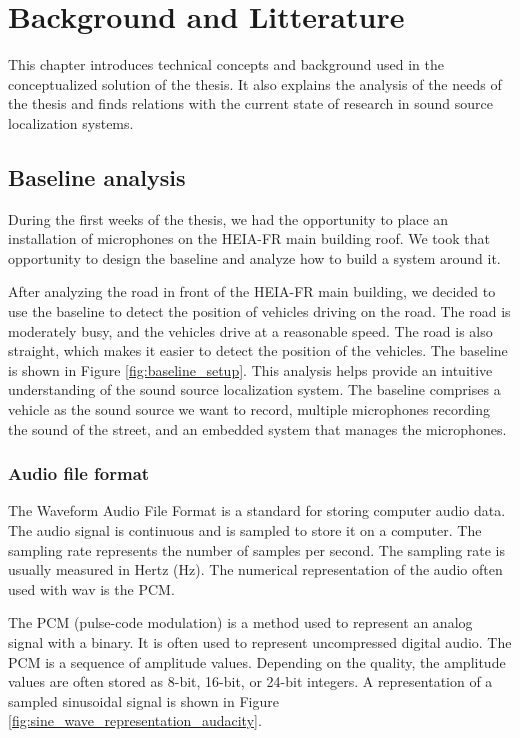 \chapter{Background and Litterature}
\label{ch:background}

This chapter introduces technical concepts and background used in the conceptualized solution of the thesis. It also explains the analysis of the needs of the thesis and finds relations with the current state of research in sound source localization systems.

\section{Baseline analysis}
\label{sec:baseline_analysis}

During the first weeks of the thesis, we had the opportunity to place an installation of microphones on the HEIA-FR main building roof. We took that opportunity to design the baseline and analyze how to build a system around it.

After analyzing the road in front of the HEIA-FR main building, we decided to use the baseline to detect the position of vehicles driving on the road. The road is moderately busy, and the vehicles drive at a reasonable speed. The road is also straight, which makes it easier to detect the position of the vehicles. The baseline is shown in Figure \ref{fig:baseline_setup}. This analysis helps provide an intuitive understanding of the sound source localization system. The baseline comprises a vehicle as the sound source we want to record, multiple microphones recording the sound of the street, and an embedded system that manages the microphones.

\subsection{Audio file format} %
\label{subsec:audio_file_format}

The Waveform Audio File Format is a standard for storing computer audio data. The audio signal is continuous and is sampled to store it on a computer. The sampling rate represents the number of samples per second. The sampling rate is usually measured in Hertz (Hz). The numerical representation of the audio often used with wav is the PCM.

The PCM (pulse-code modulation) is a method used to represent an analog signal with a binary. It is often used to represent uncompressed digital audio. The PCM is a sequence of amplitude values. Depending on the quality, the amplitude values are often stored as 8-bit, 16-bit, or 24-bit integers. A representation of a sampled sinusoidal signal is shown in Figure \ref{fig:sine_wave_representation_audacity}.


